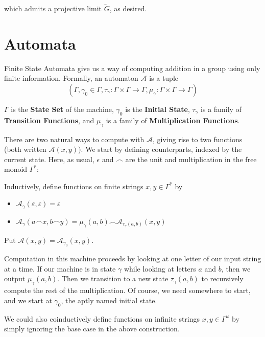 \documentclass[12pt]{article}
\theoremstyle{definition}
\begin{document}
  which admits a projective limit $\overleftarrow{G}$, as desired.

  \section{Automata}
  Finite State Automata give us a way of computing addition in a group
  using only finite information. Formally, an automaton $\mathcal{A}$
  is a tuple 
  \[
    (\Gamma
    ,\gamma_0 \in \Gamma
    ,\tau_\gamma : \Gamma \times \Gamma \to \Gamma
    ,\mu_\gamma : \Gamma \times \Gamma \to \Gamma
    )
  \]
    
  $\Gamma$ is the \textbf{State Set} of the machine, 
  $\gamma_0$ is the \textbf{Initial State},
  $\tau_\gamma$ is a family of \textbf{Transition Functions}, and
  $\mu_\gamma$ is a family of \textbf{Multiplication Functions}.

  \newpage

  There are two natural ways to compute with $\mathcal{A}$, giving rise
  to two functions (both written $\mathcal{A}(x,y)$). We start by defining
  counterparts, indexed by the current state. Here, as usual, 
  $\epsilon$ and $\frown$ are the unit and multiplication in the 
  free monoid $\Gamma^*$:

  \bigskip

  Inductively, define functions on finite strings $x,y \in \Gamma^*$ by
  \begin{itemize}
    \item $\mathcal{A}_\gamma(\varepsilon,\varepsilon) = \varepsilon$
    \item $\mathcal{A}_\gamma(a \frown x,b \frown y) = \mu_\gamma(a,b) \frown \mathcal{A}_{\tau_\gamma(a,b)}(x,y)$
  \end{itemize}
  
  Put $\mathcal{A}(x,y) = \mathcal{A}_{\gamma_0}(x,y)$. 

  Computation in this machine proceeds by looking at one letter of our input
  string at a time. If our machine is in state $\gamma$ while looking at letters
  $a$ and $b$, then we output $\mu_\gamma(a,b)$. Then we transition to a 
  new state $\tau_\gamma(a,b)$ to recursively compute the rest of the multiplication.
  Of course, we need somewhere to start, and we start at $\gamma_0$, the aptly
  named initial state.

  We could also coinductively define functions on infinite strings 
  $x,y \in \Gamma^\omega$ by simply ignoring the base case in the above
  construction.
\end{document}
